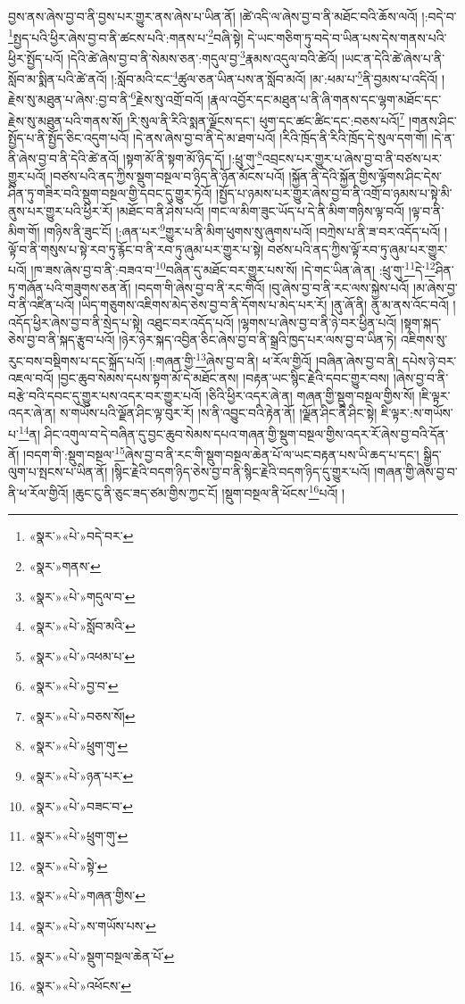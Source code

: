 བྱས་ནས་ཞེས་བྱ་བ་ནི་བྱས་པར་གྱུར་ནས་ཞེས་པ་ཡིན་ནོ། །ཚེ་འདི་ལ་ཞེས་བྱ་བ་ནི་མཐོང་བའི་ཆོས་ལའོ། །:བདེ་བ་\footnote{«སྣར་»«པེ་»བདེ་བར་}སྤྱད་པའི་ཕྱིར་ཞེས་བྱ་བ་ནི་ཚངས་པའི་:གནས་པ་\footnote{«སྣར་»གནས་}བཞི་སྟེ། དེ་ཡང་གཅིག་ཏུ་བདེ་བ་ཡིན་པས་དེས་གནས་པའི་ཕྱིར་སྤྱོད་པའོ། །དེའི་ཚེ་ཞེས་བྱ་བ་ནི་སེམས་ཅན་:གདུལ་བྱ་\footnote{«སྣར་»«པེ་»གདུལ་བ་}རྣམས་འདུལ་བའི་ཚེའོ། །ཡང་ན་དེའི་ཚེ་ཞེས་པ་ནི་སློབ་མ་སྨིན་པའི་ཚེ་ནའོ། །:སློབ་མའི་ངང་\footnote{«སྣར་»«པེ་»སློབ་མའི་}ཚུལ་ཅན་ཡིན་པས་ན་སློབ་མའོ། །མ་:ཕམ་པ་\footnote{«སྣར་»«པེ་»འཕམ་པ་}ནི་བྱམས་པ་འདིའོ། །རྗེས་སུ་མཐུན་པ་ཞེས་:བྱ་བ་ནི་\footnote{«སྣར་»«པེ་»བྱ་བ་}རྗེས་སུ་འགྲོ་བའོ། །རྣལ་འབྱོར་དང་མཐུན་པ་ནི་ཞི་གནས་དང་ལྷག་མཐོང་དང་རྗེས་སུ་མཐུན་པའི་གནས་སོ། །རི་སུལ་ནི་རིའི་སྨན་ལྗོངས་དང་། ཕུག་དང་ཚང་ཚིང་དང་:བཅས་པའོ།\footnote{«སྣར་»«པེ་»བཅས་སོ།} །གནས་ཤིང་སྤྱོད་པ་ནི་སྤྱོད་ཅིང་འདུག་པའོ། །དེ་ནས་ཞེས་བྱ་བ་ནི་དེ་མ་ཐག་པའོ། །རིའི་ཁྲོད་ནི་རིའི་ཁྲོད་དེ་སུལ་དག་གོ། །དེ་ན་ནི་ཞེས་བྱ་བ་ནི་དེའི་ཚེ་ནའོ། །སྟག་མོ་ནི་སྟག་མོ་ཉིད་དོ། །:ཕྲུ་གུ་\footnote{«སྣར་»«པེ་»ཕྲུག་གུ་}འབྲངས་པར་གྱུར་པ་ཞེས་བྱ་བ་ནི་བཙས་པར་གྱུར་པའོ། །བཙས་པའི་ནད་ཀྱིས་སྡུག་བསྔལ་བ་ཉིད་ནི་ཉོན་མོངས་པའོ། །སྐྱོན་ནི་དེའི་སྐྱོན་གྱིས་ལྟོགས་ཤིང་དེས་ཤིན་ཏུ་གཟིར་བའི་སྡུག་བསྔལ་གྱི་དབང་དུ་གྱུར་ཏེའོ། །སྤྱོད་པ་ཉམས་པར་གྱུར་ཞེས་བྱ་བ་ནི་འགྲོ་བ་ཉམས་པ་སྟེ་མི་ནུས་པར་གྱུར་པའི་ཕྱིར་རོ། །མཐོང་བ་ནི་ཤེས་པའོ། །གང་ལ་མིག་ཟུང་ཡོད་པ་དེ་ནི་མིག་གཉིས་ལྟ་བའོ། །ལྟ་བ་ནི་མིག་གོ། །གཉིས་ནི་ཟུང་ངོ། །:ཞན་པར་\footnote{«སྣར་»«པེ་»ཉན་པར་}གྱུར་པ་ནི་མིག་ཕུགས་སུ་ཞུགས་པའོ། །བཀྲེས་པ་ནི་ཟ་བར་འདོད་པའོ། །ལྟོ་བ་ནི་གསུས་པ་སྟེ་རབ་ཏུ་རྙོང་བ་ནི་རབ་ཏུ་ཞུམ་པར་གྱུར་པ་སྟེ། བཙས་པའི་ནད་ཀྱིས་ལྟོ་རབ་ཏུ་ཞུམ་པར་གྱུར་པའོ། །ཁ་ཟས་ཞེས་བྱ་བ་ནི་:བཟའ་བ་\footnote{«སྣར་»«པེ་»བཟང་བ་}བཞིན་དུ་མཐོང་བར་གྱུར་པས་སོ། །དེ་གང་ཡིན་ཞེ་ན། :ཕྲུ་གུ་\footnote{«སྣར་»«པེ་»ཕྲུག་གུ་}དེ་\footnote{«སྣར་»«པེ་»སྟེ་}ཤིན་ཏུ་གཞོན་པའི་གཟུགས་ཅན་ནོ། །བདག་གི་ཞེས་བྱ་བ་ནི་རང་གིའོ། །བུ་ཞེས་བྱ་བ་ནི་རང་ལས་སྐྱེས་པའོ། །མ་ཞེས་བྱ་བ་ནི་འཛིན་པའོ། །ཡིད་གཅུགས་འཇིགས་མེད་ཅེས་བྱ་བ་ནི་དོགས་པ་མེད་པར་རོ། །ནུ་ཞོ་ནི། ནུ་མ་ནས་འོང་བའོ། །འདོད་ཕྱིར་ཞེས་བྱ་བ་ནི་སྲེད་པ་སྟེ། འཐུང་བར་འདོད་པའོ། །ལྷགས་པ་ཞེས་བྱ་བ་ནི་ཉེ་བར་ཕྱིན་པའོ། །སྟག་སྐད་ཅེས་བྱ་བ་ནི་སྐད་རྩུབ་པའོ། །ཉེར་ཉེར་སྐད་འབྱིན་ཅིང་ཞེས་བྱ་བ་ནི་སྒྲའི་ཁྱད་པར་ལས་བྱ་བ་ཡིན་ཏེ། འཇིགས་སུ་རུང་བས་བསྡིགས་པ་དང་སྐྲོད་པའོ། །:གཞན་གྱི་\footnote{«སྣར་»«པེ་»གཞན་གྱིས་}ཞེས་བྱ་བ་ནི། ཕ་རོལ་གྱིའོ། །བཞིན་ཞེས་བྱ་བ་ནི། དཔེས་ཉེ་བར་འཇལ་བའོ། །བྱང་ཆུབ་སེམས་དཔས་སྟག་མོ་དེ་མཐོང་ནས། །བརྟན་ཡང་སྙིང་རྗེའི་དབང་གྱུར་བས། །ཞེས་བྱ་བ་ནི་བརྩེ་བའི་དབང་དུ་གྱུར་པས་འདར་བར་གྱུར་པའོ། །ཅིའི་ཕྱིར་འདར་ཞེ་ན། གཞན་གྱི་སྡུག་བསྔལ་གྱིས་སོ། །ཇི་ལྟར་འདར་ཞེ་ན། ས་གཡོས་པའི་ལྗོན་ཤིང་ལྟ་བུར་རོ། །ས་ནི་འབྱུང་བའི་རྟེན་ནོ། །ལྗོན་ཤིང་ནི་ཤིང་སྟེ། ཇི་ལྟར་:ས་གཡོས་པ་\footnote{«སྣར་»«པེ་»ས་གཡོས་པས་}ན། ཤིང་འགུལ་བ་དེ་བཞིན་དུ་བྱང་ཆུབ་སེམས་དཔའ་གཞན་གྱི་སྡུག་བསྔལ་གྱིས་འདར་རོ་ཞེས་བྱ་བའི་དོན་ནོ། །བདག་གི་:སྡུག་བསྔལ་\footnote{«སྣར་»«པེ་»སྡུག་བསྔལ་ཆེན་པོ་}ཞེས་བྱ་བ་ནི་རང་གི་སྡུག་བསྔལ་ཆེན་པོ་ལ་ཡང་བརྟན་པས་ཡི་ཆད་པ་དང་། སྒྱིད་ལུག་པ་སྤངས་པ་ཡིན་ནོ། །སྙིང་རྗེའི་བདག་ཉིད་ཅེས་བྱ་བ་ནི་སྙིང་རྗེའི་བདག་ཉིད་དུ་གྱུར་པའོ། །གཞན་གྱི་ཞེས་བྱ་བ་ནི་ཕ་རོལ་གྱིའོ། །ཆུང་ངུ་ནི་ཅུང་ཟད་ཙམ་གྱིས་ཀྱང་ངོ། །སྡུག་བསྔལ་ནི་ཕོངས་\footnote{«སྣར་»«པེ་»འཕོངས་}པའོ། །
